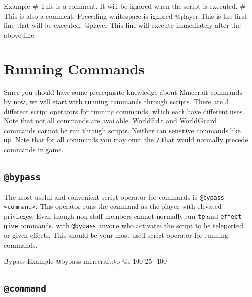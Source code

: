 \documentclass[oneside]{book}
\begin{document}
\begin{msccode}{Example}
# This is a comment. It will be ignored when the script is executed.
    # This is also a comment. Preceding whitespace is ignored
@player This is the first line that will be executed.
@player This line will execute immediately after the above line.
\end{msccode}

\section{Running Commands}

Since you should have some prerequisite knowledge about Minecraft commands by now, we will start with running commands through scripts. There are 3 different script operators for running commands, which each have different uses. Note that not all commands are available. WorldEdit and WorldGuard commands cannot be run through scripts. Neither can sensitive commands like \texttt{op}. Note that for all commands you may omit the \texttt{/} that would normally precede commands in game.

\subsection{\texttt{@bypass}}

The most useful and convenient script operator for commands is \texttt{@bypass <command>}. This operator runs the command as the player with elevated privileges. Even though non-staff members cannot normally run \texttt{tp} and \texttt{effect give} commands, with \texttt{@bypass} anyone who activates the script to be teleported or given effects. This should be your most used script operator for running commands.

\begin{msccode}{Bypass Example}
@bypass minecraft:tp @s 100 25 -100
\end{msccode}

\subsection{\texttt{@command}}
\end{document}
